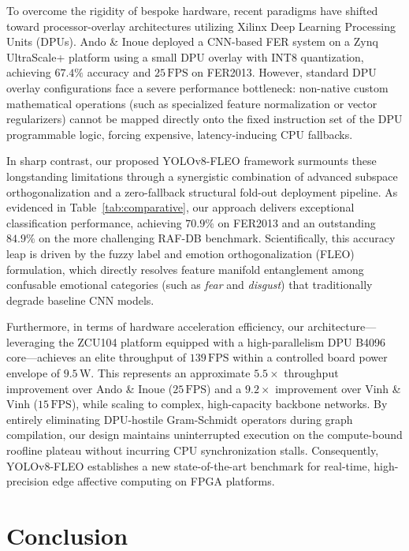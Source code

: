 \documentclass[algorithms,article,submit,moreauthors]{Definitions/mdpi}
\begin{document}
To overcome the rigidity of bespoke hardware, recent paradigms have shifted toward processor-overlay architectures utilizing Xilinx Deep Learning Processing Units (DPUs). Ando \& Inoue \citep{bib15} deployed a CNN-based FER system on a Zynq UltraScale+ platform using a small DPU overlay with INT8 quantization, achieving $67.4\%$ accuracy and $25\,\text{FPS}$ on FER2013. However, standard DPU overlay configurations face a severe performance bottleneck: non-native custom mathematical operations (such as specialized feature normalization or vector regularizers) cannot be mapped directly onto the fixed instruction set of the DPU programmable logic, forcing expensive, latency-inducing CPU fallbacks.

In sharp contrast, our proposed YOLOv8-FLEO framework surmounts these longstanding limitations through a synergistic combination of advanced subspace orthogonalization and a zero-fallback structural fold-out deployment pipeline. As evidenced in Table~\ref{tab:comparative}, our approach delivers exceptional classification performance, achieving $70.9\%$ on FER2013 and an outstanding $84.9\%$ on the more challenging RAF-DB benchmark. Scientifically, this accuracy leap is driven by the fuzzy label and emotion orthogonalization (FLEO) formulation, which directly resolves feature manifold entanglement among confusable emotional categories (such as \textit{fear} and \textit{disgust}) that traditionally degrade baseline CNN models.

Furthermore, in terms of hardware acceleration efficiency, our architecture—leveraging the ZCU104 platform equipped with a high-parallelism DPU B4096 core—achieves an elite throughput of $139\,\text{FPS}$ within a controlled board power envelope of $9.5\,\text{W}$. This represents an approximate $5.5\times$ throughput improvement over Ando \& Inoue ($25\,\text{FPS}$) and a $9.2\times$ improvement over Vinh \& Vinh ($15\,\text{FPS}$), while scaling to complex, high-capacity backbone networks. By entirely eliminating DPU-hostile Gram-Schmidt operators during graph compilation, our design maintains uninterrupted execution on the compute-bound roofline plateau without incurring CPU synchronization stalls. Consequently, YOLOv8-FLEO establishes a new state-of-the-art benchmark for real-time, high-precision edge affective computing on FPGA platforms.




\section{Conclusion}
\label{sec:conclusion}
\end{document}
